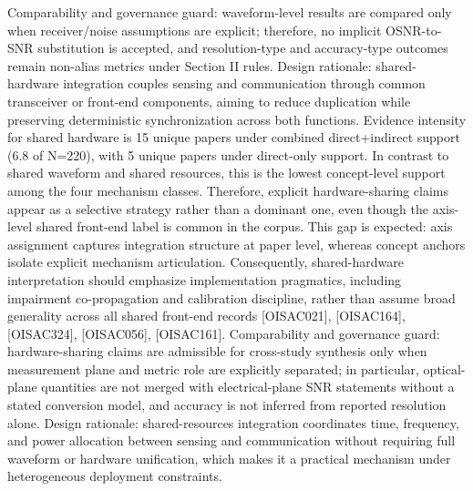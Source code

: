 {}Comparability and governance guard: waveform-level results are compared only when receiver/noise assumptions are explicit; therefore, no implicit OSNR-to-SNR substitution is accepted, and resolution-type and accuracy-type outcomes remain non-alias metrics under Section II rules.\markdownRendererInterblockSeparator
{}
\markdownRendererSectionEnd \markdownRendererSectionBegin
{}\markdownRendererInterblockSeparator
{}Design rationale: shared-hardware integration couples sensing and communication through common transceiver or front-end components, aiming to reduce duplication while preserving deterministic synchronization across both functions.\markdownRendererParagraphSeparator
{}Evidence intensity for shared hardware is 15 unique papers under combined direct+indirect support (6.8\markdownRendererPercentSign{} of N=220), with 5 unique papers under direct-only support. In contrast to shared waveform and shared resources, this is the lowest concept-level support among the four mechanism classes. Therefore, explicit hardware-sharing claims appear as a selective strategy rather than a dominant one, even though the axis-level shared front-end label is common in the corpus. This gap is expected: axis assignment captures integration structure at paper level, whereas concept anchors isolate explicit mechanism articulation. Consequently, shared-hardware interpretation should emphasize implementation pragmatics, including impairment co-propagation and calibration discipline, rather than assume broad generality across all shared front-end records [O\markdownRendererUnderscore{}ISAC\markdownRendererUnderscore{}021], [O\markdownRendererUnderscore{}ISAC\markdownRendererUnderscore{}164], [O\markdownRendererUnderscore{}ISAC\markdownRendererUnderscore{}324], [O\markdownRendererUnderscore{}ISAC\markdownRendererUnderscore{}056], [O\markdownRendererUnderscore{}ISAC\markdownRendererUnderscore{}161].\markdownRendererParagraphSeparator
{}Comparability and governance guard: hardware-sharing claims are admissible for cross-study synthesis only when measurement plane and metric role are explicitly separated; in particular, optical-plane quantities are not merged with electrical-plane SNR statements without a stated conversion model, and accuracy is not inferred from reported resolution alone.\markdownRendererInterblockSeparator
{}
\markdownRendererSectionEnd \markdownRendererSectionBegin
{}\markdownRendererInterblockSeparator
{}Design rationale: shared-resources integration coordinates time, frequency, and power allocation between sensing and communication without requiring full waveform or hardware unification, which makes it a practical mechanism under heterogeneous deployment constraints.\markdownRendererParagraphSeparator
